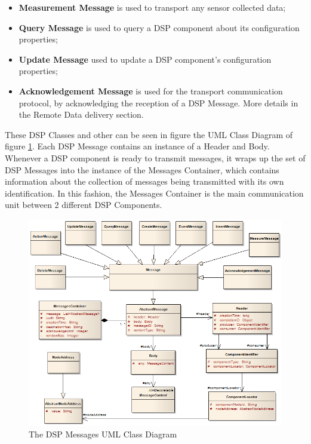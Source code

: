 \begin{itemize}
  \item \textbf{Measurement Message} is used to transport any sensor collected
  data;
  \item \textbf{Query Message} is used to query a DSP component about its
  configuration properties;
  \item \textbf{Update Message} used to update a DSP component's configuration
  properties;
  \item \textbf{Acknowledgement Message} is used for the transport communication
  protocol, by acknowledging the reception of a DSP Message. More details in the
  Remote Data delivery section.
\end{itemize}

These DSP Classes and other can be seen in figure the  UML Class
Diagram \cite{uml} of figure \ref{fig:DSP-Messages-Classes}. Each DSP Message
contains an instance of a Header and Body. Whenever a DSP component is ready
to transmit messages, it wraps up the set of DSP Messages into the instance of
the Messages Container, which contains information about the collection of
messages being transmitted with its own identification. In this fashion, the
Messages Container is the main communication unit between 2 different DSP
Components.

\begin{figure}[!t]
  \centering
  \includegraphics[scale=0.6]{../diagrams/DSP-Messages-Classes}
  \caption{The DSP Messages UML Class Diagram}
  \label{fig:DSP-Messages-Classes}
\end{figure}

